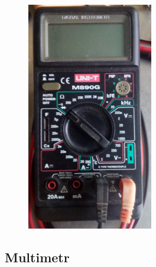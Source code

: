 % 
% 
% 
% 

\begin{figure}\includegraphics[width=5.5cm]{warsztat_elektroniczny/multimetr}\vspace{-1.2cm}\end{figure}

\subsection{Multimetr}


